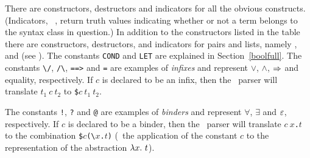 There are constructors, destructors and indicators for all the obvious
constructs. (Indicators, \eg\ , return truth values
indicating whether or not a term belongs to the syntax class in
question.) In addition to the constructors listed in the table there
are constructors, destructors, and indicators for pairs and lists,
namely ,
 and
 (see \REFERENCE).  The
constants {\small\verb+COND+} and
{\small\verb+LET+} are explained in Section~\ref{boolfull}.  The
constants {\small\verb+\/+}, {\small\verb+/\+},
{\small\verb+==>+} and {\small\verb+=+} are examples of {\it
  infixes\/} and represent $\vee$, $\wedge$, $\Rightarrow$ and equality,
respectively. If $c$ is declared to be an infix, then the \HOL\ parser
will translate $t_1\ c\ t_2$ to {\small\verb+$+}$c\ t_1\ t_2$.

The constants {\small\verb+!+}, {\small\verb+?+} and {\small\verb+@+}
are examples of \label{binder} \textit{binders} and represent $\forall$, $\exists$ and
$\varepsilon$, respectively.  If $c$ is declared to be a binder, then the
\HOL\ parser will translate $c\ x${\small\verb+.+}$t$ to the
combination
{\small\verb+$+}$c${\small\verb+(\+}$x${\small\verb+.+}$t${\small\verb+)+}
(\ie\ the application of the constant $c$ to the representation of the
abstraction $\lambda x.\ t$).



